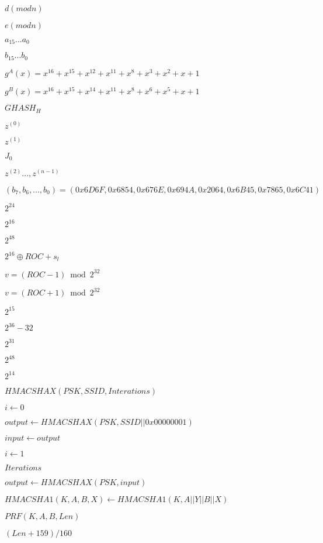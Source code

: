 \documentclass{article}
\begin{document}
$ d (mod n)$
\pagebreak

$ e (mod n)$
\pagebreak

$ {a}_{15}...{a}_{0} $
\pagebreak

$ {b}_{15}...{b}_{0} $
\pagebreak

$ {g}^{A}(x) = {x}^{16}+{x}^{15}+{x}^{12}+{x}^{11}+{x}^{8}+{x}^{3}+{x}^{2}+x+1 $
\pagebreak

$ {g}^{B}(x) = {x}^{16}+{x}^{15}+{x}^{14}+{x}^{11}+{x}^{8}+{x}^{6}+{x}^{5}+x+1 $
\pagebreak

$ {GHASH}_{H} $
\pagebreak

$ {z}^{(0)} $
\pagebreak

$ {z}^{(1)} $
\pagebreak

$ {J}_{0} $
\pagebreak

$ {z}^{(2)}...,{z}^{(n-1)} $
\pagebreak

$ ({b}_{7},{b}_{6},...,{b}_{0}) = (0x6D6F,0x6854,0x676E,0x694A,0x2064,0x6B45,0x7865,0x6C41) $
\pagebreak

${2}^{24}$
\pagebreak

${2}^{16}$
\pagebreak

${2}^{48}$
\pagebreak

${2}^{16} \oplus ROC + s_l$
\pagebreak

$v=(ROC-1) \bmod{{2}^{32}}$
\pagebreak

$v=(ROC+1) \bmod{{2}^{32}}$
\pagebreak

${2}^{15}$
\pagebreak

${2}^{36}-32$
\pagebreak

$ {2}^{31}$
\pagebreak

$ {2}^{48}$
\pagebreak

${2}^{14}$
\pagebreak

$ HMACSHAX(PSK, SSID, Interations) $
\pagebreak

$ i \leftarrow 0 $
\pagebreak

$ output \leftarrow HMACSHAX(PSK, SSID||0x00000001) $
\pagebreak

$ input \leftarrow output $
\pagebreak

$ i \leftarrow 1 $
\pagebreak

$ Iterations $
\pagebreak

$ output \leftarrow HMACSHAX(PSK, input) $
\pagebreak

$ HMACSHA1(K, A, B, X) \leftarrow HMACSHA1(K, A || Y || B || X) $
\pagebreak

$ PRF(K, A, B, Len) $
\pagebreak

$ (Len+159)/160 $
\pagebreak
\end{document}
